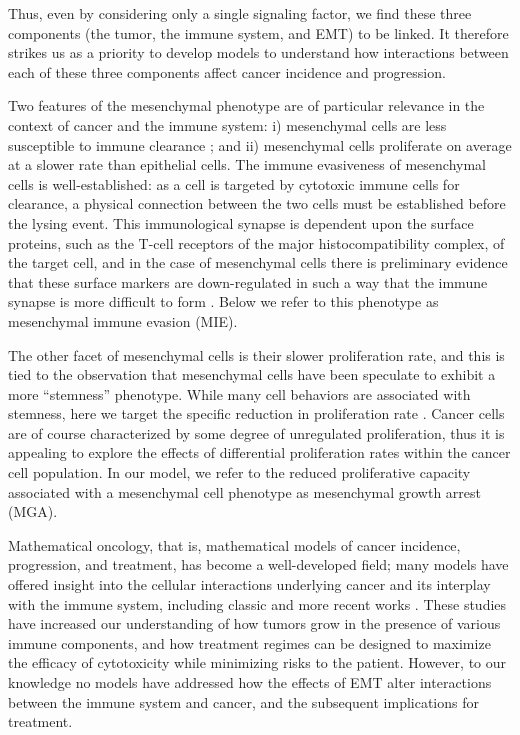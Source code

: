 \documentclass[11pt]{article}
\begin{document}
Thus, even by considering only a single signaling factor, we find these three components (the tumor, the immune system, and EMT) to be linked. It therefore strikes us as a priority to develop models to understand how interactions between each of these three components affect cancer incidence and progression.
\par
Two features of the mesenchymal phenotype are of particular relevance in the context of cancer and the immune system: i) mesenchymal cells are less susceptible to immune clearance \cite{terry2017new}; and ii) mesenchymal cells proliferate on average at a slower rate than epithelial cells.
The immune evasiveness of mesenchymal cells is well-established: as a cell is targeted by cytotoxic immune cells for clearance, a physical connection between the two cells must be established before the lysing event.
This immunological synapse is dependent upon the surface proteins, such as the T-cell receptors of the major histocompatibility complex, of the target cell, and in the case of mesenchymal cells there is preliminary evidence that these surface markers are down-regulated in such a way that the immune synapse is more difficult to form \cite{terry2017new}.
Below we refer to this phenotype as mesenchymal immune evasion (MIE).
\par
The other facet of mesenchymal cells is their slower proliferation rate, and this is tied to the observation that mesenchymal cells have been speculate to exhibit a more ``stemness'' phenotype.
While many cell behaviors are associated with stemness, here we target the specific reduction in proliferation rate \cite{woods2014effects}.
Cancer cells are of course characterized by some degree of unregulated proliferation, thus it is appealing to explore the effects of differential proliferation rates within the cancer cell population.
In our model, we refer to the reduced proliferative capacity associated with a mesenchymal cell phenotype as mesenchymal growth arrest (MGA).
\par
Mathematical oncology, that is, mathematical models of cancer incidence, progression, and treatment, has become a well-developed field; many models have offered insight into the cellular interactions underlying cancer and its interplay with the immune system, including classic \cite{anderson98_continuous, sherrattjonathana.92_oncogenes, pillis05_validated} and more recent works \cite{kim18_cell, gallaher14_bridging, gallaher18_spatial, an15_agentbased, serre16_mathematical, louzoun14_mathematical, briones-orta13_arkadia, lavi13_role, greene15_modeling, greene16_mathematical, cho17_modeling-1,  benzekry17_mathematical, owen11_mathematical, west18_multidrug}. These studies have increased our understanding of how tumors grow in the presence of various immune components, and how treatment regimes can be designed to maximize the efficacy of cytotoxicity while minimizing risks to the patient. However, to our knowledge no models have addressed how the effects of EMT alter interactions between the immune system and cancer, and the subsequent implications for treatment. 
\end{document}
